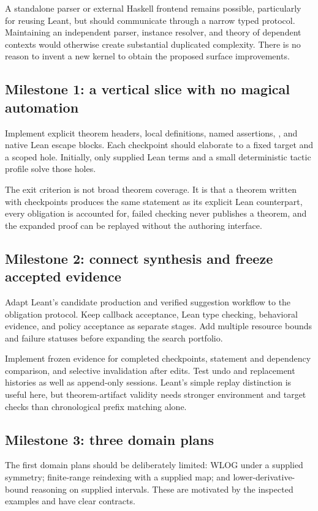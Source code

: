 \documentclass[11pt,a4paper]{article}
\theoremstyle{definition}
\theoremstyle{remark}
\numberwithin{equation}{section}
\begin{document}
A standalone parser or external Haskell frontend remains possible, particularly for reusing Leant, but should communicate through a narrow typed protocol. Maintaining an independent parser, instance resolver, and theory of dependent contexts would otherwise create substantial duplicated complexity. There is no reason to invent a new kernel to obtain the proposed surface improvements.

\subsection{Milestone 1: a vertical slice with no magical automation}
Implement explicit theorem headers, local definitions, named assertions, \texttt{}, and native Lean escape blocks. Each checkpoint should elaborate to a fixed target and a scoped hole. Initially, only supplied Lean terms and a small deterministic tactic profile solve those holes.

The exit criterion is not broad theorem coverage. It is that a theorem written with checkpoints produces the same statement as its explicit Lean counterpart, every obligation is accounted for, failed checking never publishes a theorem, and the expanded proof can be replayed without the authoring interface.

\subsection{Milestone 2: connect synthesis and freeze accepted evidence}
Adapt Leant's candidate production and verified suggestion workflow to the obligation protocol. Keep callback acceptance, Lean type checking, behavioral evidence, and policy acceptance as separate stages. Add multiple resource bounds and failure statuses before expanding the search portfolio.

Implement frozen evidence for completed checkpoints, statement and dependency comparison, and selective invalidation after edits. Test undo and replacement histories as well as append-only sessions. Leant's simple replay distinction is useful here, but theorem-artifact validity needs stronger environment and target checks than chronological prefix matching alone.

\subsection{Milestone 3: three domain plans}
The first domain plans should be deliberately limited: WLOG under a supplied symmetry; finite-range reindexing with a supplied map; and lower-derivative-bound reasoning on supplied intervals. These are motivated by the inspected examples and have clear contracts.
\end{document}

